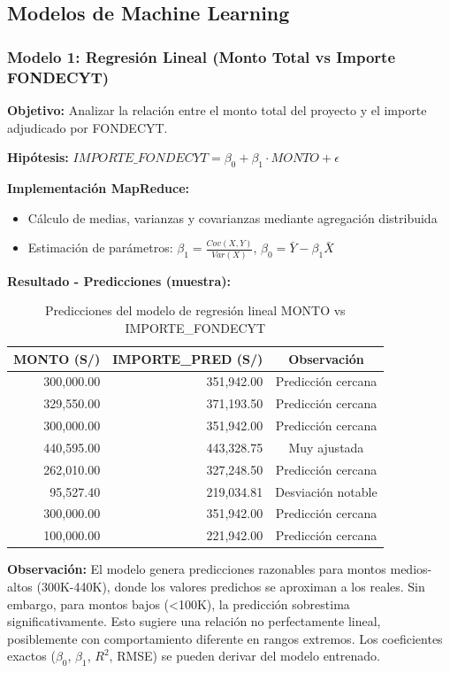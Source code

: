 \documentclass[12pt,a4paper]{article}
\begin{document}
\subsection{Modelos de Machine Learning}

\subsubsection{Modelo 1: Regresión Lineal (Monto Total vs Importe FONDECYT)}

\textbf{Objetivo:} Analizar la relación entre el monto total del proyecto y el importe adjudicado por FONDECYT.

\textbf{Hipótesis:} $IMPORTE\_FONDECYT = \beta_0 + \beta_1 \cdot MONTO + \epsilon$

\textbf{Implementación MapReduce:}
\begin{itemize}
    \item Cálculo de medias, varianzas y covarianzas mediante agregación distribuida
    \item Estimación de parámetros: $\beta_1 = \frac{Cov(X,Y)}{Var(X)}$, $\beta_0 = \bar{Y} - \beta_1\bar{X}$
\end{itemize}

\textbf{Resultado - Predicciones (muestra):}

\begin{table}[H]
\centering
\small
\begin{tabular}{rrc}
\toprule
\textbf{MONTO (S/)} & \textbf{IMPORTE\_PRED (S/)} & \textbf{Observación} \\
\midrule
300,000.00 & 351,942.00 & Predicción cercana \\
329,550.00 & 371,193.50 & Predicción cercana \\
300,000.00 & 351,942.00 & Predicción cercana \\
440,595.00 & 443,328.75 & Muy ajustada \\
262,010.00 & 327,248.50 & Predicción cercana \\
95,527.40 & 219,034.81 & Desviación notable \\
300,000.00 & 351,942.00 & Predicción cercana \\
100,000.00 & 221,942.00 & Predicción cercana \\
\bottomrule
\end{tabular}
\caption{Predicciones del modelo de regresión lineal MONTO vs IMPORTE\_FONDECYT}
\label{tab:regresion}
\end{table}

\textbf{Observación:} El modelo genera predicciones razonables para montos medios-altos (300K-440K), donde los valores predichos se aproximan a los reales. Sin embargo, para montos bajos (<100K), la predicción sobrestima significativamente. Esto sugiere una relación no perfectamente lineal, posiblemente con comportamiento diferente en rangos extremos. Los coeficientes exactos ($\beta_0$, $\beta_1$, $R^2$, RMSE) se pueden derivar del modelo entrenado.
\end{document}
